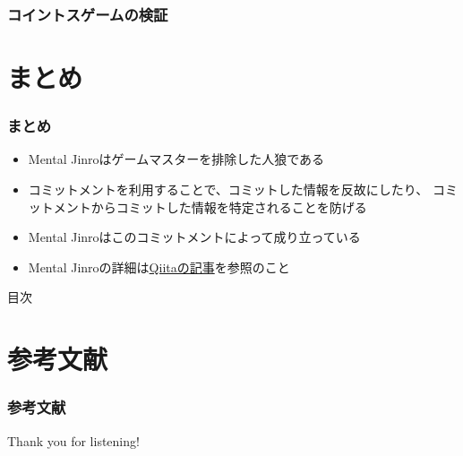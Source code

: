 \begin{frame}[fragile]
  \frametitle{コイントスゲームの検証}

  \begin{center}




  \end{center}
\end{frame}

\section{まとめ}
\begin{frame}[fragile]
  \frametitle{まとめ}

  \begin{itemize}
    \item<2-> Mental Jinroはゲームマスターを排除した人狼である
    \item<3-> コミットメントを利用することで、コミットした情報を反故にしたり、
      コミットメントからコミットした情報を特定されることを防げる
    \item<4-> Mental Jinroはこのコミットメントによって成り立っている
    \item<5-> Mental Jinroの詳細は\href{http://qiita.com/yyu/items/8c10fcdbc17084ac2674}{Qiitaの記事}を参照のこと
  \end{itemize}
\end{frame}

\begin{frame}{目次}
  \tableofcontents
\end{frame}

\section*{参考文献}
\begin{frame}
  \frametitle{参考文献}

  \nocite{*}
  
  
\end{frame}

\begin{frame}
  \centering
  {\Huge Thank you for listening!}
\end{frame}



